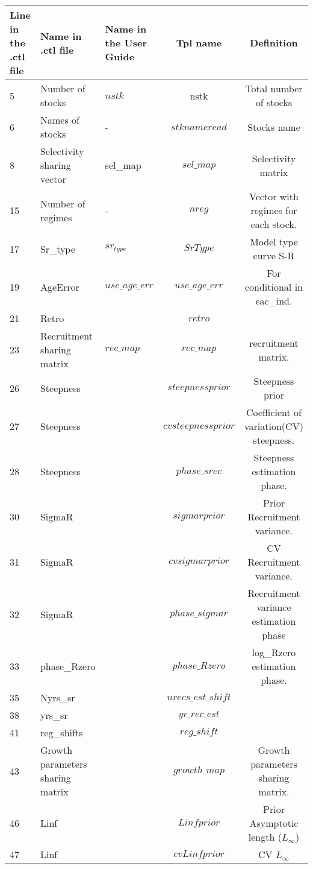\documentclass{article}
\begin{document}
\begin{tabular}{|  p{0.9cm} | p{1.9cm}  | p{1.9cm} | c | c |}
\hline
Line in the .ctl file & Name in .ctl file  & Name in the User Guide & Tpl name & Definition\\ \hline  \hline
 5 &  Number of stocks & $nstk$  & nstk & Total number of stocks\\ \hline
6 &  Names of stocks & - & $stknameread$   & Stocks name\\ \hline
8 &  Selectivity sharing vector & sel\_map  & $sel\_map$ & Selectivity matrix\\ \hline
15 &  Number of regimes &  - & $nreg$ & Vector with regimes for each stock.\\ \hline
17 &  Sr\_type & $sr_{type}$  & $SrType$ & Model type curve S-R\\ \hline
19 &  AgeError & $use\_age\_err$  & $use\_age\_err$ & For conditional in eac\_ind.\\ \hline
21 &  Retro &   & $retro$ &\\ \hline
23 & Recruitment sharing matrix &  $rec\_map$ & $rec\_map$ & recruitment matrix.\\ \hline
26 &  Steepness &   & $steepnessprior$ & Steepness prior\\ \hline
27 &  Steepness &   & $cvsteepnessprior$ & Coefficient of variation(CV) steepness.\\ \hline
28 &  Steepness &   & $phase\_srec$ & Steepness estimation phase.\\ \hline
30 &  SigmaR &   & $sigmarprior$ & Prior Recruitment variance.
\\ \hline
31 &  SigmaR &   & $cvsigmarprior$ & CV Recruitment variance.\\ \hline
32 &  SigmaR &   & $phase\_sigmar$ & Recruitment variance estimation phase \\ \hline
33 &  phase\_Rzero &   & $phase\_Rzero$ & log\_Rzero estimation phase.\\ \hline
35 &  Nyrs\_sr &   & $nrecs\_est\_shift$ & \\ \hline
38 &  yrs\_sr &   & $yr\_rec\_est$ &\\ \hline
41 &  reg\_shifts &   & $reg\_shift$ & \\ \hline
43 &  Growth parameters sharing matrix &   & $growth\_map$ & Growth parameters sharing matrix.\\ \hline
46 &  Linf &   & $Linfprior$ & Prior  Asymptotic length ($L_{\infty}$)\\ \hline
47 &  Linf &   & $cvLinfprior$ & CV $L_{\infty}$\\ \hline

\end{tabular}
\end{document}
